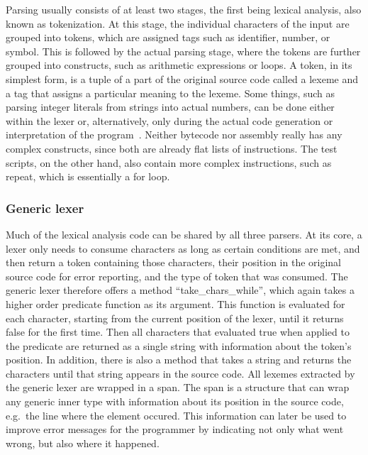 Parsing usually consists of at least two stages, the first being lexical analysis, also known as tokenization.
At this stage, the individual characters of the input are grouped into tokens, which are assigned tags such as identifier, number, or symbol.
This is followed by the actual parsing stage, where the tokens are further grouped into constructs, such as arithmetic expressions or loops.
A token, in its simplest form, is a tuple of a part of the original source code called a lexeme and a tag that assigns a particular meaning to the lexeme.
Some things, such as parsing integer literals from strings into actual numbers, can be done either within the lexer or, alternatively, only during the actual code generation or interpretation of the program~\cite{nystrom2021crafting}.
Neither bytecode nor assembly really has any complex constructs, since both are already flat lists of instructions.
The test scripts, on the other hand, also contain more complex instructions, such as repeat, which is essentially a for loop.

\subsubsection{Generic lexer}
Much of the lexical analysis code can be shared by all three parsers.
At its core, a lexer only needs to consume characters as long as certain conditions are met, and then return a token containing those characters, their position in the original source code for error reporting, and the type of token that was consumed.
The generic lexer therefore offers a method ``take\_chars\_while'', which again takes a higher order predicate function as its argument.
This function is evaluated for each character, starting from the current position of the lexer, until it returns false for the first time.
Then all characters that evaluated true when applied to the predicate are returned as a single string with information about the token's position.
In addition, there is also a method that takes a string and returns the characters until that string appears in the source code.
\label{spans}
All lexemes extracted by the generic lexer are wrapped in a span.
The span is a structure that can wrap any generic inner type with information about its position in the source code, e.g.\ the line where the element occured.
This information can later be used to improve error messages for the programmer by indicating not only what went wrong, but also where it happened.

